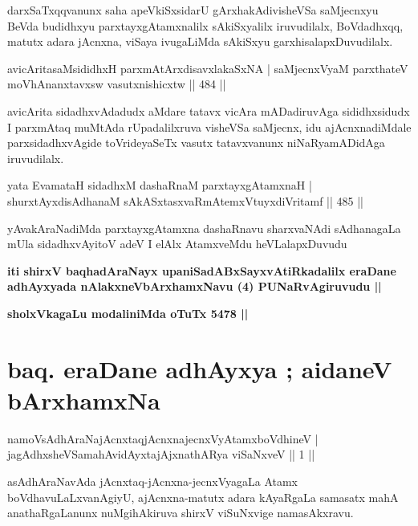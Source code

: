 \begin{artha}
darxSaTxqqvanunx saha apeVkiSxsidarU gArxhakAdivisheVSa saMjecnxyu BeVda budidhxyu parxtayxgAtamxnalilx sAkiSxyalilx iruvudilalx, BoVdadhxqq, matutx adara jAcnxna, viSaya ivugaLiMda sAkiSxyu garxhisalapxDuvudilalx.
\end{artha}


\begin{shl}
avicAritasaMsididhxH parxmAtArxdisavxlakaSxNA |
saMjecnxVyaM parxthateV moVhAnanxtavxsw vasutxnishicxtw \hfill  || 484 ||
\end{shl}

\begin{artha}
avicArita sidadhxvAdadudx aMdare tatavx vicAra mADadiruvAga sididhxsidudx I parxmAtaq muMtAda rUpadalilxruva visheVSa saMjecnx, idu ajAcnxnadiMdale parxsidadhxvAgide toVrideyaSeTx vasutx tatavxvanunx niNaRyamADidAga iruvudilalx.
\end{artha}

\begin{shl}
yata EvamataH sidadhxM dashaRnaM parxtayxgAtamxnaH |
shurxtAyxdisAdhanaM sAkASxtasxvaRmAtemxVtuyxdiVritamf \hfill  || 485 ||
\end{shl}

\begin{artha}
yAvakAraNadiMda parxtayxgAtamxna dashaRnavu sharxvaNAdi sAdhanagaLa mUla
sidadhxvAyitoV adeV I elAlx AtamxveMdu heVLalapxDuvudu 
\end{artha}

\begin{center}
\textbf{iti shirxV baqhadAraNayx upaniSadABxSayxvAtiRkadalilx eraDane
adhAyxyada nAlakxneVbArxhamxNavu (4) PUNaRvAgiruvudu ||}

\textbf{sholxVkagaLu modaliniMda oTuTx 5478 ||}
\end{center}

\section*{baq. eraDane adhAyxya ; aidaneV bArxhamxNa }

\begin{shl}
namoV\s sAdhAraNajAcnxtaqjAcnxnajecnxVyAtamxboVdhineV |\\
jagAdhxsheVSamahAvidAyxtajAjxnathARya viSaNxveV \hfill || 1 ||
\end{shl}

\begin{artha}
asAdhAraNavAda jAcnxtaq-jAcnxna-jecnxVyagaLa Atamx boVdhavuLaLxvanAgiyU, ajAcnxna-matutx adara kAyaRgaLa samasatx mahA anathaRgaLanunx nuMgihAkiruva shirxV viSuNxvige namasAkxravu.
\end{artha}

